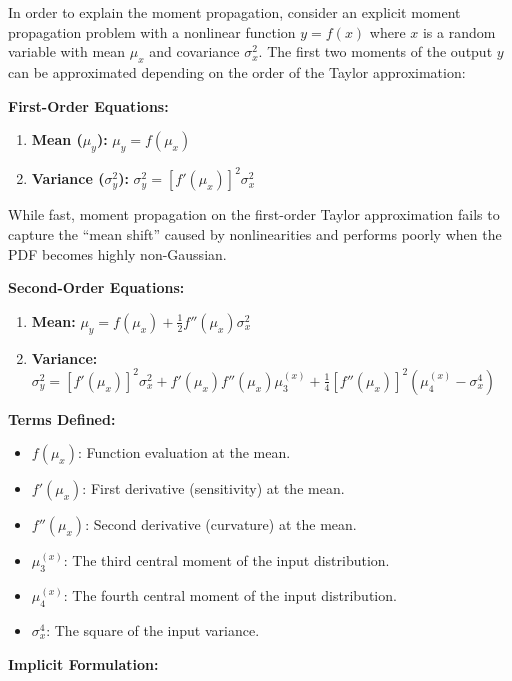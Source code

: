 \documentclass[
  letterpaper,
  DIV=11,
  numbers=noendperiod,
  oneside]{scrartcl}
\begin{document}
In order to explain the moment propagation, consider an explicit moment
propagation problem with a nonlinear function \(y = f(x)\) where \(x\)
is a random variable with mean \(\mu_x\) and covariance \(\sigma_x^2\).
The first two moments of the output \(y\) can be approximated depending
on the order of the Taylor approximation:

\textbf{First-Order Equations:}

\begin{enumerate}
\def\labelenumi{\arabic{enumi}.}
\item
  \textbf{Mean (\(\mu_y\)):} \(\mu_y = f(\mu_x)\)
\item
  \textbf{Variance (\(\sigma_y^2\)):}
  \(\sigma_y^2 = [f'(\mu_x)]^2 \sigma_x^2\)
\end{enumerate}

While fast, moment propagation on the first-order Taylor approximation
fails to capture the ``mean shift'' caused by nonlinearities and
performs poorly when the PDF becomes highly non-Gaussian.

\textbf{Second-Order Equations:}

\begin{enumerate}
\def\labelenumi{\arabic{enumi}.}
\item
  \textbf{Mean:}
  \(\mu_y = f(\mu_x) + \frac{1}{2} f''(\mu_x) \sigma_x^2\)
\item
  \textbf{Variance:}
  \(\sigma_y^2 = [f'(\mu_x)]^2\sigma_x^2 + f'(\mu_x)f''(\mu_x)\mu_3^{(x)} + \frac{1}{4}[f''(\mu_x)]^2 (\mu_4^{(x)}-\sigma_x^4)\)
\end{enumerate}

\textbf{Terms Defined:}

\begin{itemize}
\item
  \(f(\mu_x)\): Function evaluation at the mean.
\item
  \(f'(\mu_x)\): First derivative (sensitivity) at the mean.
\item
  \(f''(\mu_x)\): Second derivative (curvature) at the mean.
\item
  \(\mu_3^{(x)}\): The third central moment of the input distribution.
\item
  \(\mu_4^{(x)}\): The fourth central moment of the input distribution.
\item
  \(\sigma_x^4\): The square of the input variance.
\end{itemize}

\textbf{Implicit Formulation:}
\end{document}
